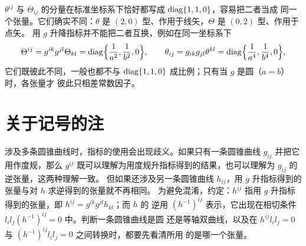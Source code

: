 \begin{remark}
$\theta^{ij}$ 与 $\Theta_{ij}$ 的分量在标准坐标系下恰好都写成 $\operatorname{diag}\{1,1,0\}$，容易把二者当成
同一个张量。它们确实不同：$\theta$ 是 $(2,0)$ 型、作用于线矢，$\Theta$ 是 $(0,2)$ 型、作用于点矢。
用 $g$ 升降指标并不能把二者互换，例如在同一坐标系下
\[
\Theta^{ij}=g^{ik}g^{jl}\Theta_{kl}
=\operatorname{diag}\Bigl\{\frac{1}{a^2},\frac{1}{b^2},0\Bigr\},
\qquad
\theta_{ij}=g_{ik}g_{jl}\theta^{kl}
=\operatorname{diag}\Bigl\{\frac{1}{a^4},\frac{1}{b^4},0\Bigr\},
\]
它们既彼此不同，一般也都不与 $\operatorname{diag}\{1,1,0\}$ 成比例；只有当 $g$ 是圆（$a=b$）时，各张量才
彼此只相差常数因子。
\end{remark}

\section{关于记号的注}

涉及多条圆锥曲线时，指标的使用会出现歧义。如果只有一条圆锥曲线 $g_{ij}$ 并把它用作度规，那么
$g^{ij}$ 既可以理解为用度规升指标得到的结果，也可以理解为 $g_{ij}$ 的逆张量，这两种理解一致。
但如果还涉及另一条圆锥曲线 $h_{ij}$，用 $g$ 升指标得到的张量与对 $h$ 求逆得到的张量就不再相同。
为避免混淆，约定：$h^{ij}$ 指用 $g$ 升指标得到的张量，即 $h^{ij}=g^{ik}g^{jl}h_{kl}$；而 $h$ 的
逆用 $(h^{-1})^{ij}$ 表示，它出现在相切条件 $l_il_j(h^{-1})^{ij}=0$ 中。判断一条圆锥曲线是圆
还是等轴双曲线，以及在 $h^{ij}l_il_j=0$ 与 $(h^{-1})^{ij}l_il_j=0$ 之间转换时，都要先看清所用
的是哪一个张量。
